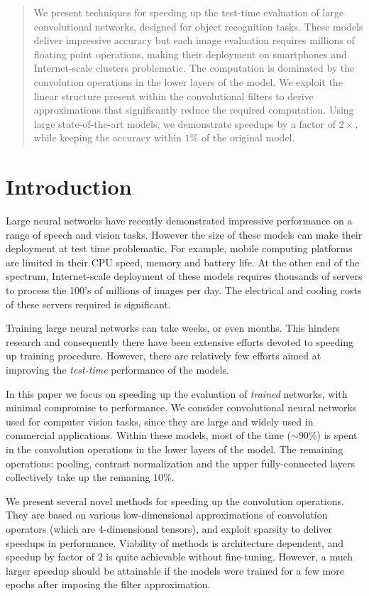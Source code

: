 \begin{abstract}
  We present techniques for speeding up the test-time evaluation of
  large convolutional networks, designed for object recognition
  tasks. These models deliver impressive accuracy but each image
  evaluation requires millions of floating point operations, making
  their deployment on smartphones and Internet-scale clusters
  problematic. The computation is dominated by the convolution
  operations in the lower layers of the model. We exploit the linear
  structure present within the convolutional filters to derive
  approximations that significantly reduce the required
  computation. Using large state-of-the-art models, we demonstrate
  speedups by a factor of $2\times$, while keeping the accuracy
  within $1\%$ of the original model.
\end{abstract}

\section{Introduction}

Large neural networks have recently demonstrated impressive
performance on a range of speech and vision tasks. However the size of
these models can make their deployment at test time problematic. For
example, mobile computing platforms are limited in their CPU speed,
memory and battery life. At the other end of the spectrum,
Internet-scale deployment of these models requires thousands of
servers to process the 100's of millions of images per day. The
electrical and cooling costs of these servers required is significant.

Training large neural networks can take weeks, or even
months. This hinders research and consequently there have been
extensive efforts devoted to speeding up training procedure.  However,
there are relatively few efforts aimed at improving the {\em test-time}
performance of the models. 

In this paper we focus on speeding up the evaluation of {\em trained}
networks, with minimal compromise to performance. We consider
convolutional neural networks used for computer vision tasks, since
they are large and widely used in commercial applications. Within
these models, most of the time ($\sim90\%$) is spent in the
convolution operations in the lower layers of the model. The remaining
operations: pooling, contrast normalization and the upper
fully-connected layers collectively take up the remaning $10\%$.

We present several novel methods for speeding up the convolution
operations. They are based on various low-dimensional approximations of convolution
operators (which are 4-dimensional tensors), and exploit sparsity to
deliver speedups in performance. Viability of methods is architecture 
dependent, and speedup by factor of $2$ is quite achievable without fine-tuning.
However, a much larger speedup should be attainable if the models were
trained for a few more epochs after imposing the filter approximation.

